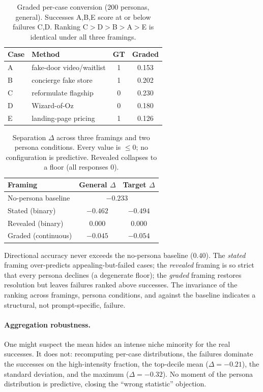 \documentclass{article}
\begin{document}
\begin{table}[t]\caption{Graded per-case conversion (200 personas, general).
Successes A,B,E score at or below failures C,D. Ranking C$>$D$>$B$>$A$>$E is
identical under all three framings.}\label{tab:cases}\vskip 0.1in
\centering\small\begin{tabular}{llcc}\toprule
Case & Method & GT & Graded \\ \midrule
A & fake-door video/waitlist & 1 & 0.153 \\
B & concierge fake store & 1 & 0.202 \\
C & reformulate flagship & 0 & 0.230 \\
D & Wizard-of-Oz & 0 & 0.180 \\
E & landing-page pricing & 1 & 0.126 \\ \bottomrule
\end{tabular}\vskip 0.1in\end{table}

\begin{table}[t]\caption{Separation $\Delta$ across three framings and two persona
conditions. Every value is $\le 0$; no configuration is predictive. Revealed
collapses to a floor (all responses $0$).}\label{tab:framings}\vskip 0.1in
\centering\small\begin{tabular}{lcc}\toprule
Framing & General $\Delta$ & Target $\Delta$ \\ \midrule
No-persona baseline & \multicolumn{2}{c}{$-0.233$} \\
Stated (binary) & $-0.462$ & $-0.494$ \\
Revealed (binary) & $0.000$ & $0.000$ \\
Graded (continuous) & $-0.045$ & $-0.054$ \\ \bottomrule
\end{tabular}\vskip 0.1in\end{table}

Directional accuracy never exceeds the no-persona baseline ($0.40$). The
\emph{stated} framing over-predicts appealing-but-failed cases; the \emph{revealed}
framing is so strict that every persona declines (a degenerate floor); the
\emph{graded} framing restores resolution but leaves failures ranked above
successes. The invariance of the ranking across framings, persona conditions, and
against the baseline indicates a structural, not prompt-specific, failure.

\paragraph{Aggregation robustness.} One might suspect the mean hides an intense
niche minority for the real successes. It does not: recomputing per-case
distributions, the failures dominate the successes on the high-intensity fraction,
the top-decile mean ($\Delta=-0.21$), the standard deviation, and the maximum
($\Delta=-0.32$). No moment of the persona distribution is predictive, closing the
``wrong statistic'' objection.
\end{document}
